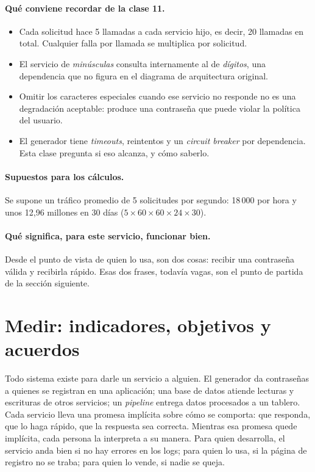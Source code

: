 \documentclass[variant=apuntes,cover=institutional,mode=screen]{ua-engineering-v6-article}
\begin{document}
\paragraph{Qué conviene recordar de la clase 11.}
\begin{itemize}
\item Cada solicitud hace 5 llamadas a cada servicio hijo, es decir, 20 llamadas en total. Cualquier falla por llamada se multiplica por solicitud.
\item El servicio de \emph{minúsculas} consulta internamente al de \emph{dígitos}, una dependencia que no figura en el diagrama de arquitectura original.
\item Omitir los caracteres especiales cuando ese servicio no responde no es una degradación aceptable: produce una contraseña que puede violar la política del usuario.
\item El generador tiene \emph{timeouts}, reintentos y un \emph{circuit breaker} por dependencia. Esta clase pregunta si eso alcanza, y cómo saberlo.
\end{itemize}

\paragraph{Supuestos para los cálculos.} Se supone un tráfico promedio de 5 solicitudes por segundo: 18\,000 por hora y unos 12{,}96 millones en 30 días ($5 \times 60 \times 60 \times 24 \times 30$).

\paragraph{Qué significa, para este servicio, funcionar bien.} Desde el punto de vista de quien lo usa, son dos cosas: recibir una contraseña válida y recibirla rápido. Esas dos frases, todavía vagas, son el punto de partida de la sección siguiente.

\section{Medir: indicadores, objetivos y acuerdos}\label{sec:medir}

Todo sistema existe para darle un servicio a alguien. El generador da contraseñas a quienes se registran en una aplicación; una base de datos atiende lecturas y escrituras de otros servicios; un \emph{pipeline} entrega datos procesados a un tablero. Cada servicio lleva una promesa implícita sobre cómo se comporta: que responda, que lo haga rápido, que la respuesta sea correcta. Mientras esa promesa quede implícita, cada persona la interpreta a su manera. Para quien desarrolla, el servicio anda bien si no hay errores en los logs; para quien lo usa, si la página de registro no se traba; para quien lo vende, si nadie se queja.
\end{document}
